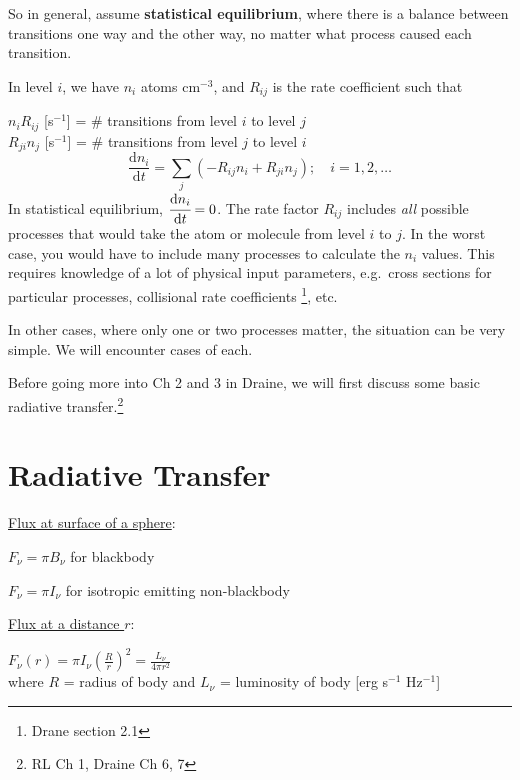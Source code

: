 \documentclass[12pt]{article}
\newcommand{\mar}[1]{\hspace{0pt}\marginpar{-\textcolor{black}{#1}-}}
\begin{document}
So in general, assume \textbf{statistical equilibrium}, where there is
a balance between transitions one way and the other way, no matter
what process caused each transition.

In level $i$, we have $n_{i}$ atoms cm$^{-3}$, and
$R_{ij}$ is the rate coefficient such that

$n_{i}R_{ij}$ [s$^{-1}$] = \# transitions from level $i$ to level $j$\\
$R_{ji}n_{j}$ [s$^{-1}$] = \# transitions from level $j$ to level $i$\\

$${ \frac{\mathrm{d}n_{i}}{\mathrm{d}t} =
    \sum_{j}\left(-R_{ij}n_{i} + R_{ji}n_{j}\right);\quad i=1,2,\ldots
}$$
In\mar{23} statistical equilibrium,
$\cfrac{\mathrm{d}n_{i}}{\mathrm{d}t} = 0$. The rate factor $R_{ij}$
includes \emph{all} possible processes that would take the atom or
molecule from level $i$ to $j$. In the worst case, you would have to
include many processes to calculate the $n_{i}$ values. This requires
knowledge of a lot of physical input parameters, e.g.\ cross sections
for particular processes, collisional rate coefficients
\footnote{Drane section 2.1}, etc.

In other cases, where only one or two processes matter, the situation
can be very simple. We will encounter cases of each.

Before going more into Ch 2 and 3 in Draine, we will first discuss
some basic radiative transfer.\footnote{RL Ch 1, Draine Ch 6, 7}

\section{Radiative Transfer}\mar{24}
\begin{minipage}{0.45\textwidth}
    \underline{Flux at surface of a sphere}:
    \begin{list}{}
    \item $F_{\nu} = \pi{B_{\nu}}$ for blackbody
    \item $F_{\nu} = \pi{I_{\nu}}$ for isotropic emitting non-blackbody
    \end{list}
\end{minipage}
\hfill\begin{minipage}{0.45\textwidth}
    \underline{Flux at a distance $r$}:
    \begin{list}{}
    \item $F_{\nu}(r) = \pi{I_{\nu}}(\frac{R}{r})^{2}
        = \frac{L_{\nu}}{4\pi{r^{2}}}   $\\
        where $R$ = radius of body and $L_{\nu}$ = luminosity of body
        [erg s$^{-1}$ Hz$^{-1}$]
    \end{list}
\end{minipage}
\end{document}
